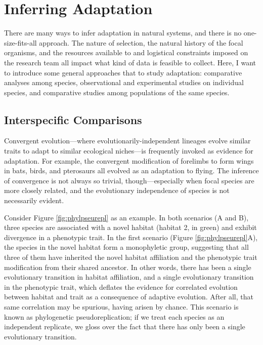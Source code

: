 \documentclass[
]{book}
\begin{document}
\hypertarget{inferring-adaptation}{%
\section{Inferring Adaptation}\label{inferring-adaptation}}

There are many ways to infer adaptation in natural systems, and there is no one-size-fits-all approach. The nature of selection, the natural history of the focal organisms, and the resources available to and logistical constraints imposed on the research team all impact what kind of data is feasible to collect. Here, I want to introduce some general approaches that to study adaptation: comparative analyses among species, observational and experimental studies on individual species, and comparative studies among populations of the same species.

\hypertarget{interspecific-comparisons}{%
\subsection{Interspecific Comparisons}\label{interspecific-comparisons}}

Convergent evolution---where evolutionarily-independent lineages evolve similar traits to adapt to similar ecological niches---is frequently invoked as evidence for adaptation. For example, the convergent modification of forelimbs to form wings in bats, birds, and pterosaurs all evolved as an adaptation to flying. The inference of convergence is not always so trivial, though---especially when focal species are more closely related, and the evolutionary independence of species is not necessarily evident.

Consider Figure \ref{fig:phylpseurepl} as an example. In both scenarios (A and B), three species are associated with a novel habitat (habitat 2, in green) and exhibit divergence in a phenotypic trait. In the first scenario (Figure \ref{fig:phylpseurepl}A), the species in the novel habitat form a monophyletic group, suggesting that all three of them have inherited the novel habitat affiliation and the phenotypic trait modification from their shared ancestor. In other words, there has been a single evolutionary transition in habitat affiliation, and a single evolutionary transition in the phenotypic trait, which deflates the evidence for correlated evolution between habitat and trait as a consequence of adaptive evolution. After all, that same correlation may be spurious, having arisen by chance. This scenario is known as phylogenetic pseudoreplication; if we treat each species as an independent replicate, we gloss over the fact that there has only been a single evolutionary transition.
\end{document}
